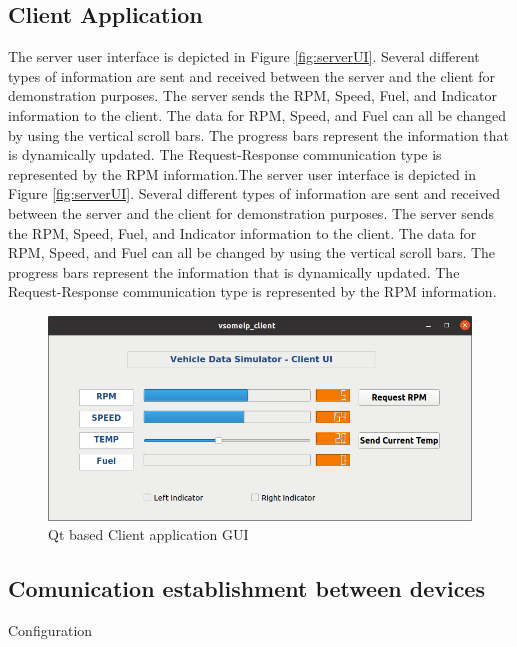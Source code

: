 \subsection{Client Application}
The server user interface is depicted in Figure \ref{fig:serverUI}. Several different types of information are sent and received between the server and the client for demonstration purposes. The server sends the RPM, Speed, Fuel, and Indicator information to the client. The data for RPM, Speed, and Fuel can all be changed by using the vertical scroll bars. The progress bars represent the information that is dynamically updated. The Request-Response communication type is represented by the RPM information.The server user interface is depicted in Figure \ref{fig:serverUI}. Several different types of information are sent and received between the server and the client for demonstration purposes. The server sends the RPM, Speed, Fuel, and Indicator information to the client. The data for RPM, Speed, and Fuel can all be changed by using the vertical scroll bars. The progress bars represent the information that is dynamically updated. The Request-Response communication type is represented by the RPM information.

\begin{figure}[!htb] 

	\centering
		\includegraphics[width=1\textwidth]{images/clientUI.png}
	\caption{Qt based Client application GUI}
	\label{fig:clientUI}
\end{figure}

\subsection{Comunication establishment between devices}
Configuration
